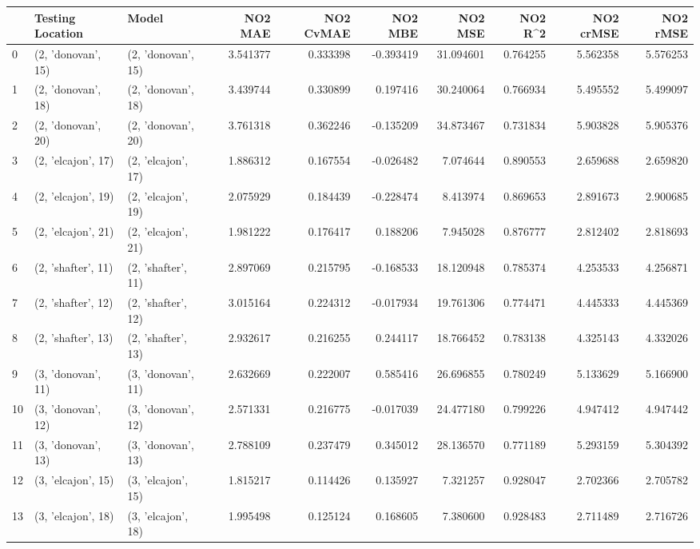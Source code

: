 \begin{tabular}{lllrrrrrrr}
\toprule
{} &    Testing Location &               Model &   NO2 MAE &  NO2 CvMAE &   NO2 MBE &    NO2 MSE &   NO2 R\textasciicircum2 &  NO2 crMSE &  NO2 rMSE \\
\midrule
0  &  (2, 'donovan', 15) &  (2, 'donovan', 15) &  3.541377 &   0.333398 & -0.393419 &  31.094601 &  0.764255 &   5.562358 &  5.576253 \\
1  &  (2, 'donovan', 18) &  (2, 'donovan', 18) &  3.439744 &   0.330899 &  0.197416 &  30.240064 &  0.766934 &   5.495552 &  5.499097 \\
2  &  (2, 'donovan', 20) &  (2, 'donovan', 20) &  3.761318 &   0.362246 & -0.135209 &  34.873467 &  0.731834 &   5.903828 &  5.905376 \\
3  &  (2, 'elcajon', 17) &  (2, 'elcajon', 17) &  1.886312 &   0.167554 & -0.026482 &   7.074644 &  0.890553 &   2.659688 &  2.659820 \\
4  &  (2, 'elcajon', 19) &  (2, 'elcajon', 19) &  2.075929 &   0.184439 & -0.228474 &   8.413974 &  0.869653 &   2.891673 &  2.900685 \\
5  &  (2, 'elcajon', 21) &  (2, 'elcajon', 21) &  1.981222 &   0.176417 &  0.188206 &   7.945028 &  0.876777 &   2.812402 &  2.818693 \\
6  &  (2, 'shafter', 11) &  (2, 'shafter', 11) &  2.897069 &   0.215795 & -0.168533 &  18.120948 &  0.785374 &   4.253533 &  4.256871 \\
7  &  (2, 'shafter', 12) &  (2, 'shafter', 12) &  3.015164 &   0.224312 & -0.017934 &  19.761306 &  0.774471 &   4.445333 &  4.445369 \\
8  &  (2, 'shafter', 13) &  (2, 'shafter', 13) &  2.932617 &   0.216255 &  0.244117 &  18.766452 &  0.783138 &   4.325143 &  4.332026 \\
9  &  (3, 'donovan', 11) &  (3, 'donovan', 11) &  2.632669 &   0.222007 &  0.585416 &  26.696855 &  0.780249 &   5.133629 &  5.166900 \\
10 &  (3, 'donovan', 12) &  (3, 'donovan', 12) &  2.571331 &   0.216775 & -0.017039 &  24.477180 &  0.799226 &   4.947412 &  4.947442 \\
11 &  (3, 'donovan', 13) &  (3, 'donovan', 13) &  2.788109 &   0.237479 &  0.345012 &  28.136570 &  0.771189 &   5.293159 &  5.304392 \\
12 &  (3, 'elcajon', 15) &  (3, 'elcajon', 15) &  1.815217 &   0.114426 &  0.135927 &   7.321257 &  0.928047 &   2.702366 &  2.705782 \\
13 &  (3, 'elcajon', 18) &  (3, 'elcajon', 18) &  1.995498 &   0.125124 &  0.168605 &   7.380600 &  0.928483 &   2.711489 &  2.716726 \\

\end{tabular}
